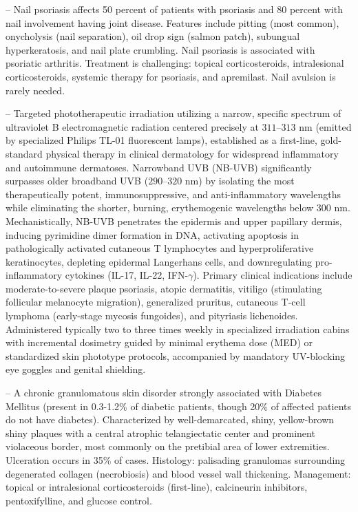 -- Nail psoriasis affects 50 percent of patients with psoriasis and 80 percent with nail involvement having joint disease. Features include pitting (most common), onycholysis (nail separation), oil drop sign (salmon patch), subungual hyperkeratosis, and nail plate crumbling. Nail psoriasis is associated with psoriatic arthritis. Treatment is challenging: topical corticosteroids, intralesional corticosteroids, systemic therapy for psoriasis, and apremilast. Nail avulsion is rarely needed.

-- Targeted phototherapeutic irradiation utilizing a narrow, specific spectrum of ultraviolet B electromagnetic radiation centered precisely at $311\text{--}313\text{ nm}$ (emitted by specialized Philips TL-01 fluorescent lamps), established as a first-line, gold-standard physical therapy in clinical dermatology for widespread inflammatory and autoimmune dermatoses. Narrowband UVB (NB-UVB) significantly surpasses older broadband UVB ($290\text{--}320\text{ nm}$) by isolating the most therapeutically potent, immunosuppressive, and anti-inflammatory wavelengths while eliminating the shorter, burning, erythemogenic wavelengths below $300\text{ nm}$. Mechanistically, NB-UVB penetrates the epidermis and upper papillary dermis, inducing pyrimidine dimer formation in DNA, activating apoptosis in pathologically activated cutaneous T lymphocytes and hyperproliferative keratinocytes, depleting epidermal Langerhans cells, and downregulating pro-inflammatory cytokines (IL-17, IL-22, IFN-$\gamma$). Primary clinical indications include moderate-to-severe plaque psoriasis, atopic dermatitis, vitiligo (stimulating follicular melanocyte migration), generalized pruritus, cutaneous T-cell lymphoma (early-stage mycosis fungoides), and pityriasis lichenoides. Administered typically two to three times weekly in specialized irradiation cabins with incremental dosimetry guided by minimal erythema dose (MED) or standardized skin phototype protocols, accompanied by mandatory UV-blocking eye goggles and genital shielding.

-- A chronic granulomatous skin disorder strongly associated with Diabetes Mellitus (present in 0.3-1.2\% of diabetic patients, though 20\% of affected patients do not have diabetes). Characterized by well-demarcated, shiny, yellow-brown shiny plaques with a central atrophic telangiectatic center and prominent violaceous border, most commonly on the pretibial area of lower extremities. Ulceration occurs in 35\% of cases. Histology: palisading granulomas surrounding degenerated collagen (necrobiosis) and blood vessel wall thickening. Management: topical or intralesional corticosteroids (first-line), calcineurin inhibitors, pentoxifylline, and glucose control.

